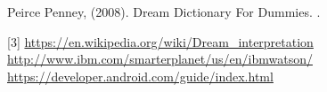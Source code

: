 \documentclass[twoside]{article}
\begin{document}

\begin{thebibliography}{99} %
%

\bibitem[1] [[Peirce Penney, 2008]
Peirce Penney, (2008).
\newblock Dream Dictionary For Dummies. 
.


\noindent


\end{thebibliography}
[3] \url{https://en.wikipedia.org/wiki/Dream_interpretation} \newline
[4] \url{http://www.ibm.com/smarterplanet/us/en/ibmwatson/} \newline
[5] \url{https://developer.android.com/guide/index.html} \newline

\end{document}
